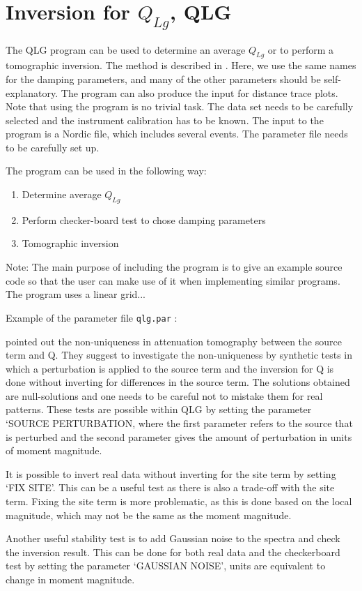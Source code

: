 
\section{Inversion for $Q_{Lg}$, QLG} 

The QLG program can be used to determine an average $Q_{Lg}$ or to 
perform a tomographic inversion. The method is described in \citet{ottemoller2002}. 
Here, we use the same names for the damping parameters, and many of 
the other parameters should be self-explanatory. The program can also 
produce the input for distance trace plots. Note that using the program 
is no trivial task. The data set needs to be carefully selected and 
the instrument calibration has to be known. The input to the program 
is a Nordic file, which includes several events. The parameter file 
needs to be carefully set up. 

The program can be used in the following way: 
\begin{enumerate}
\item
Determine average $Q_{Lg}$ 
\item
Perform checker-board test to chose damping parameters 
\item
Tomographic inversion 
\end{enumerate}

Note: The main purpose of including the program is to give an example source code so that the user can make use of it when implementing similar programs. The program uses a linear grid... 

Example of the parameter file \texttt{qlg.par} : 



\citet{menke2006} pointed out the non-uniqueness in attenuation tomography between the source term and Q. They suggest to investigate the non-uniqueness by synthetic tests in which a perturbation is applied to the source term and the inversion for Q is done without inverting for differences in the source term. The solutions obtained are null-solutions and one needs to be careful not to mistake them for real patterns. These tests are possible within QLG by setting the parameter `SOURCE PERTURBATION, where the first parameter refers to the source that is perturbed and the second parameter gives the amount of perturbation in units of moment magnitude. 

It is possible to invert real data without inverting for the site term by setting `FIX SITE'. This can be a useful test as there is also a trade-off with the site term. Fixing the site term is more problematic, as this is done based on the local magnitude, which may not be the same as the moment magnitude. 

Another useful stability test is to add Gaussian noise to the spectra and check the inversion result. This can be done for both real data and the checkerboard test by setting the parameter `GAUSSIAN NOISE', units are equivalent to change in moment magnitude. 

